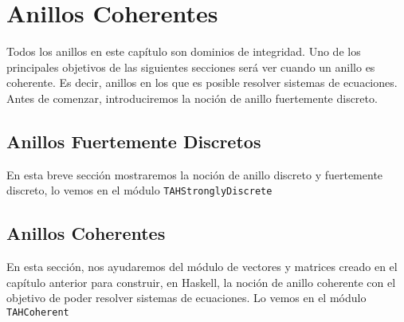 \chapter{Anillos Coherentes}\label{sec:coherentHas}
Todos los anillos en este capítulo son dominios de integridad. Uno de los principales objetivos de las siguientes secciones será ver cuando un anillo es coherente. Es decir, anillos en los que es posible resolver sistemas de ecuaciones. Antes de comenzar, introduciremos la noción de anillo fuertemente discreto.
\section{Anillos Fuertemente Discretos}
En esta breve sección mostraremos la noción de anillo discreto y fuertemente discreto, lo vemos en el módulo \texttt{TAHStronglyDiscrete} 

\section{Anillos Coherentes}
En esta sección, nos ayudaremos del módulo de vectores y matrices creado en el capítulo anterior para construir, en Haskell, la noción de anillo coherente con el objetivo de poder resolver sistemas de ecuaciones. Lo vemos en el módulo \texttt{TAHCoherent} 
